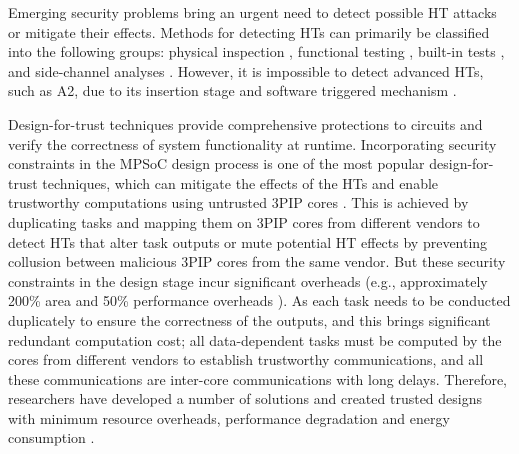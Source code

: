 \documentclass[10pt,journal, compsoc]{IEEEtran}
\begin{document}
Emerging security problems bring an urgent need to detect possible HT attacks or mitigate their effects. Methods for detecting HTs can primarily be classified into the following groups: physical inspection \cite{network:SS}, functional testing \cite{conference:BB}, built-in tests \cite{article:DD}, and side-channel analyses \cite{article:YH1}. However, it is impossible to detect advanced HTs, such as A2, due to its insertion stage and software triggered mechanism \cite{conference:YH}.%



Design-for-trust techniques provide comprehensive protections to circuits and verify the correctness of system functionality at runtime. Incorporating security constraints in the MPSoC design process is one of the most popular design-for-trust techniques, which can mitigate the effects of the HTs and enable trustworthy computations using untrusted 3PIP cores \cite{article:JR3, article:TR, conference:MB, conference:XC, conference:MS}. This is achieved by duplicating tasks and mapping them on 3PIP cores from different vendors to detect HTs that alter task outputs or mute potential HT effects by preventing collusion between malicious 3PIP cores from the same vendor. But these security constraints in the design stage incur significant overheads (e.g., approximately 200\% area and 50\% performance overheads \cite{article:XC}). As each task needs to be conducted duplicately to ensure the correctness of the outputs, and this brings significant redundant computation cost; all data-dependent tasks must be computed by the cores from different vendors to establish trustworthy communications, and all these communications are inter-core communications with long delays. Therefore, researchers have developed a number of solutions and created trusted designs with minimum resource overheads, performance degradation and energy consumption \cite{article:SR, conference:AS, article:YS, article:XC}.
\end{document}
